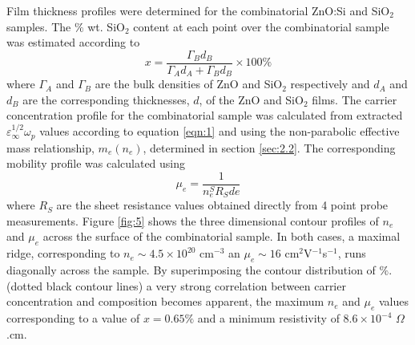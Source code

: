 \documentclass[final,5p,times]{elsarticle}
\begin{document}
Film thickness profiles were determined for the combinatorial ZnO:Si and SiO$_{2}$ samples. The $\%$ wt. SiO$_{2}$ content at each point over the combinatorial sample was estimated according to
\begin{equation}
\label{eqn:8}
x = \frac{\Gamma_{B}d_{B}}{\Gamma_Ad_A+\Gamma_{B}d_{B}}\times100\%
\end{equation}
where $\Gamma_A$ and $\Gamma_B$ are the bulk densities of ZnO and SiO$_{2}$ respectively and $d_A$ and $d_B$ are the corresponding thicknesses, $d$, of the ZnO and SiO$_{2}$ films. The carrier concentration profile for the combinatorial sample was calculated from extracted $\varepsilon_{\infty}^{1/2}\omega_p$ values according to equation \ref{eqn:1} and using the non-parabolic effective mass relationship, $m_e(n_e)$, determined in section \ref{sec:2.2}. The corresponding mobility profile was calculated using
\begin{equation}
\label{eqn:9}
\mu_e=\frac{1}{n_e^SR_Sde}
\end{equation}
where $R_S$ are the sheet resistance values obtained directly from 4 point probe measurements. Figure \ref{fig:5} shows the three dimensional contour profiles of $n_e$ and $\mu_e$ across the surface of the combinatorial sample. In both cases, a maximal ridge, corresponding to $n_e\sim 4.5\times10^{20}$ cm$^{-3}$ an $\mu_e \sim 16$ cm$^2$V$^{-1}$s$^{-1}$, runs diagonally across the sample. By superimposing the contour distribution of $\%$. (dotted black contour lines) a very strong correlation between carrier concentration and composition becomes apparent, the maximum $n_e$ and $\mu_e$ values corresponding to a value of $x=0.65\%$ and a minimum resistivity of $8.6\times10^{-4}$ $\Omega$.cm.
\end{document}
